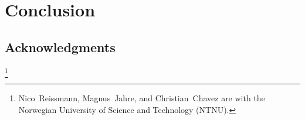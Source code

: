 
\clearpage
\section{Conclusion}
\label{sec:conclusion}


\subsection{Acknowledgments}

\thanks{Nico~Reissmann, Magnus~Jahre, and Christian~Chavez are with the
Norwegian University of Science and Technology (NTNU).}
